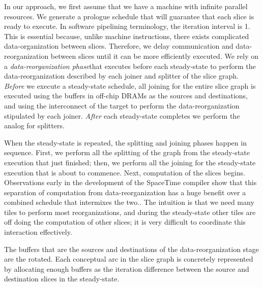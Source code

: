 In our approach, we first assume that we have a machine with infinite
parallel resources.  We generate a prologue schedule that will
guarantee that each slice is ready to execute.  In software pipelining
terminology, the iteration interval is 1.  This is essential because,
unlike machine instructions, there exists complicated
data-organization between slices. Therefore, we delay communication
and data-reorganization between slices until it can be more
efficiently executed.  We rely on a {\it data-reorganization
phase}that executes before each steady-state to perform the
data-reorganization described by each joiner and splitter of the slice
graph.  {\it Before} we execute a steady-state schedule, all joining
for the entire slice graph is executed using the buffers in off-chip
DRAMs as the sources and destinations, and using the interconnect of
the target to perform the data-reorganization stipulated by each
joiner.  {\it After} each steady-state completes we perform the analog
for splitters.

When the steady-state is repeated, the splitting and joining phases
happen in sequence.  First, we perform all the splitting of the graph
from the steady-state execution that just finished; then, we perform
all the joining for the steady-state execution that is about to
commence. Next, computation of the slices begins.  Observations early
in the development of the SpaceTime compiler show that this separation
of computation from data-reorganization has a huge benefit over a
combined schedule that intermixes the two..  The intuition is that we
need many tiles to perform most reorganizations, and during the
steady-state other tiles are off doing the computation of other
slices; it is very difficult to coordinate this interaction
effectively.

The buffers that are the sources and destinations of the
data-reorganization stage are the rotated.  Each conceptual arc in the
slice graph is concretely represented by allocating enough buffers as
the iteration difference between the source and destination slices in
the steady-state.

